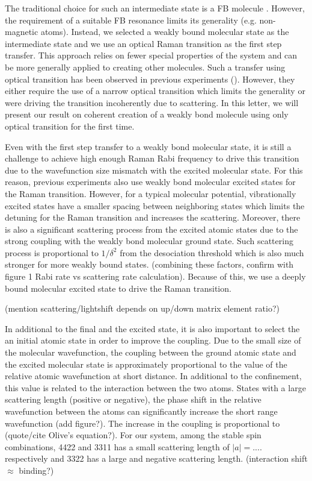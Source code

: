 \documentclass[aps,prl,twocolumn,groupedaddress]{revtex4-1}
\newcommand{\abs}[1]{{\left|{#1}\right|}}
\newcommand{\todo}[1]{}
\begin{document}
The traditional choice for such an intermediate state is a FB molecule \todo{cite our FB result}. However, the requirement of a suitable FB resonance limits its generality (e.g. non-magnetic atoms). Instead, we selected a weakly bound molecular state as the intermediate state and we use an optical Raman transition as the first step transfer. This approach relies on fewer special properties of the system and can be more generally applied to creating other molecules. Such a transfer using optical transition has been observed in previous experiments (\todo{cite}). However, they either require the use of a narrow optical transition which limits the generality or were driving the transition incoherently due to scattering. In this letter, we will present our result on coherent creation of a weakly bond molecule using only optical transition for the first time.

Even with the first step transfer to a weakly bond molecular state, it is still a challenge to achieve high enough Raman Rabi frequency to drive this transition due to the wavefunction size mismatch with the excited molecular state. For this reason, previous experiments also use weakly bond molecular excited states for the Raman transition. However, for a typical molecular potential, vibrationally excited states have a smaller spacing between neighboring states which limits the detuning for the Raman transition and increases the scattering. Moreover, there is also a significant scattering process from the excited atomic states due to the strong coupling with the weakly bond molecular ground state. Such scattering process is proportional to $1/\delta^2$ from the desociation threshold which is also much stronger for more weakly bound states. (combining these factors, confirm with figure 1 Rabi rate vs scattering rate calculation). Because of this, we use a deeply bound molecular excited state to drive the Raman transition.

(mention scattering/lightshift depends on up/down matrix element ratio?)

In additional to the final and the excited state, it is also important to select the an initial atomic state in order to improve the coupling. Due to the small size of the molecular wavefunction, the coupling between the ground atomic state and the excited molecular state is approximately proportional to the value of the relative atomic wavefunction at short distance. In additional to the confinement, this value is related to the interaction between the two atoms. States with a large scattering length (positive or negative), the phase shift in the relative wavefunction between the atoms can significantly increase the short range wavefunction (add figure?). The increase in the coupling is proportional to (quote/cite Olive's equation?).
For our system, among the stable spin combinations, 4422 and 3311 has a small scattering length of $\abs{a}=....$ respectively and 3322 has a large and negative scattering length.
(interaction shift $\approx$ binding?)
\end{document}
